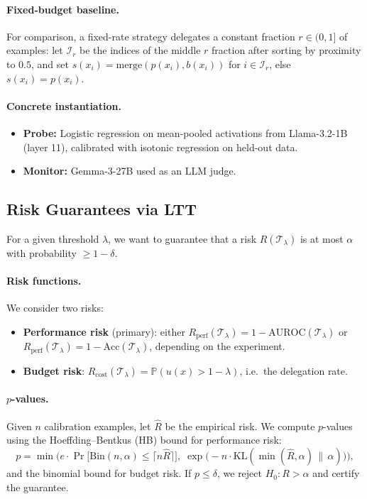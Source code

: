 \documentclass{article}
\begin{document}
\paragraph{Fixed-budget baseline.}
For comparison, a fixed-rate strategy delegates a constant fraction $r \in (0,1]$ of examples: let $\mathcal{I}_r$ be the indices of the middle $r$ fraction after sorting by proximity to $0.5$, and set $s(x_i) = \mathrm{merge}(p(x_i), b(x_i))$ for $i \in \mathcal{I}_r$, else $s(x_i)=p(x_i)$.

\paragraph{Concrete instantiation.}
\begin{itemize}
    \item \textbf{Probe:} Logistic regression on mean-pooled activations from Llama-3.2-1B (layer 11), calibrated with isotonic regression on held-out data.
    \item \textbf{Monitor:} Gemma-3-27B used as an LLM judge.
\end{itemize}


\subsection{Risk Guarantees via LTT}
\label{sec:ltt}

For a given threshold $\lambda$, we want to guarantee that a risk $R(\mathcal{T}_\lambda)$ is at most $\alpha$ with probability $\geq 1-\delta$.

\paragraph{Risk functions.}
We consider two risks:
\begin{itemize}
    \item \textbf{Performance risk} (primary): either $R_{\text{perf}}(\mathcal{T}_\lambda) = 1 - \text{AUROC}(\mathcal{T}_\lambda)$ or $R_{\text{perf}}(\mathcal{T}_\lambda) = 1 - \text{Acc}(\mathcal{T}_\lambda)$, depending on the experiment.
    \item \textbf{Budget risk}: $R_{\text{cost}}(\mathcal{T}_\lambda) = \mathbb{P}(u(x) > 1-\lambda)$, i.e.\ the delegation rate.
\end{itemize}

\paragraph{$p$-values.}
Given $n$ calibration examples, let $\hat{R}$ be the empirical risk. We compute $p$-values using the Hoeffding--Bentkus (HB) bound for performance risk:
\begin{equation}
    \label{eq:hb_pvalue}
    p = \min\!\Big(
        e \cdot \Pr\!\big[\text{Bin}(n, \alpha) \leq \lceil n\hat{R}\rceil\big],\;
        \exp\!\big(-n \cdot \text{KL}(\min(\hat{R}, \alpha) \,\|\, \alpha)\big)
    \Big),
\end{equation}
and the binomial bound for budget risk.
If $p \leq \delta$, we reject $H_0: R > \alpha$ and certify the guarantee.
\end{document}

